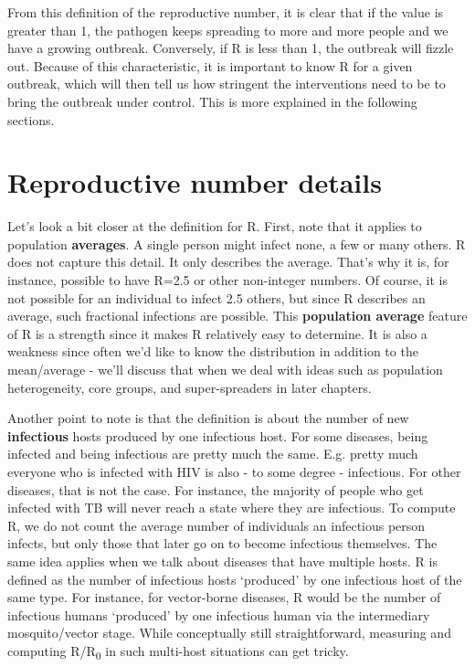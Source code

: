 \documentclass[]{book}
\theoremstyle{definition}
\theoremstyle{definition}
\theoremstyle{definition}
\theoremstyle{remark}
\begin{document}
From this definition of the reproductive number, it is clear that if the
value is greater than 1, the pathogen keeps spreading to more and more
people and we have a growing outbreak. Conversely, if R is less than 1,
the outbreak will fizzle out. Because of this characteristic, it is
important to know R for a given outbreak, which will then tell us how
stringent the interventions need to be to bring the outbreak under
control. This is more explained in the following sections.

\section{Reproductive number details}\label{reproductive-number-details}

Let's look a bit closer at the definition for R. First, note that it
applies to population \textbf{averages}. A single person might infect
none, a few or many others. R does not capture this detail. It only
describes the average. That's why it is, for instance, possible to have
R=2.5 or other non-integer numbers. Of course, it is not possible for an
individual to infect 2.5 others, but since R describes an average, such
fractional infections are possible. This \textbf{population average}
feature of R is a strength since it makes R relatively easy to
determine. It is also a weakness since often we'd like to know the
distribution in addition to the mean/average - we'll discuss that when
we deal with ideas such as population heterogeneity, core groups, and
super-spreaders in later chapters.

Another point to note is that the definition is about the number of new
\textbf{infectious} hosts produced by one infectious host. For some
diseases, being infected and being infectious are pretty much the same.
E.g. pretty much everyone who is infected with HIV is also - to some
degree - infectious. For other diseases, that is not the case. For
instance, the majority of people who get infected with TB will never
reach a state where they are infectious. To compute R, we do not count
the average number of individuals an infectious person infects, but only
those that later go on to become infectious themselves. The same idea
applies when we talk about diseases that have multiple hosts. R is
defined as the number of infectious hosts `produced' by one infectious
host of the same type. For instance, for vector-borne diseases, R would
be the number of infectious humans `produced' by one infectious human
via the intermediary mosquito/vector stage. While conceptually still
straightforward, measuring and computing R/R\textsubscript{0} in such
multi-host situations can get tricky.
\end{document}
